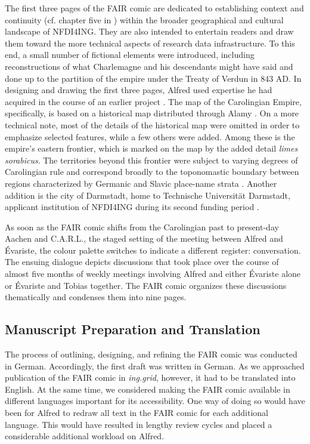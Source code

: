 \documentclass{inggrid}
\begin{document}
The first three pages of the FAIR comic are dedicated to establishing context and continuity (cf. chapter five in \cite{edwards_common_1987}) within the broader geographical and cultural landscape of NFDI4ING. They are also intended to entertain readers and draw them toward the more technical aspects of research data infrastructure. To this end, a small number of fictional elements were introduced, including reconstructions of what Charlemagne and his descendants might have said and done up to the partition of the empire under the Treaty of Verdun in 843 AD. In designing and drawing the first three pages, Alfred used expertise he had acquired in the course of an earlier project \cite{neuwald_karl_2014}. The map of the Carolingian Empire, specifically, is based on a historical map distributed through Alamy \cite{noauthor_europe843_nodate}. On a more technical note, most of the details of the historical map were omitted in order to emphasize selected features, while a few others were added. Among these is the empire's eastern frontier, which is marked on the map by the added detail \textit{limes sorabicus}. The territories beyond this frontier were subject to varying degrees of Carolingian rule and correspond broadly to the toponomastic boundary between regions characterized by Germanic and Slavic place-name strata \cite{jelic_ethnonym_2019}. Another addition is the city of Darmstadt, home to Technische Universität Darmstadt, applicant institution of NFDI4ING during its second funding period \cite{noauthor_dfg_nodate}.

As soon as the FAIR comic shifts from the Carolingian past to present-day Aachen and C.A.R.L., the staged setting of the meeting between Alfred and Évariste, the colour palette switches to indicate a different register: conversation. The ensuing dialogue depicts discussions that took place over the course of almost five months of weekly meetings involving Alfred and either Évariste alone or Évariste and Tobias together. The FAIR comic organizes these discussions thematically and condenses them into nine pages.

\subsection{Manuscript Preparation and Translation}
The process of outlining, designing, and refining the FAIR comic was conducted in German. Accordingly, the first draft was written in German. As we approached publication of the FAIR comic in \textit{ing.grid}, however, it had to be translated into English. At the same time, we considered making the FAIR comic available in different languages important for its accessibility. One way of doing so would have been for Alfred to redraw all text in the FAIR comic for each additional language. This would have resulted in lengthy review cycles and placed a considerable additional workload on Alfred.
\end{document}
